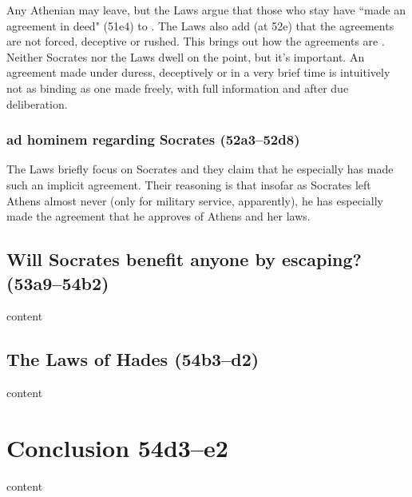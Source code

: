 \documentclass[11pt]{article}
\begin{document}
Any Athenian may leave, but the Laws argue that those who stay have ``made an agreement in deed" (51e4) to .  The Laws also add (at 52e) that the agreements are not forced, deceptive or rushed.  This brings out how the agreements are .  Neither Socrates nor the Laws dwell on the point, but it's important.  An agreement made under duress, deceptively or in a very brief time is intuitively not as binding as one made freely, with full information and after due deliberation.


\subsubsection{ad hominem regarding Socrates (52a3--52d8)}

The Laws briefly focus on Socrates and they claim that he especially has made such an implicit agreement.  Their reasoning is that insofar as Socrates left Athens almost never (only for military service, apparently), he has especially made the  agreement that he approves of Athens and her laws.

\subsection{Will Socrates benefit anyone by escaping? (53a9--54b2)}

content

\subsection{The Laws of Hades (54b3--d2)}

content


\section{Conclusion 54d3--e2}

content

\newpage


\end{document}
